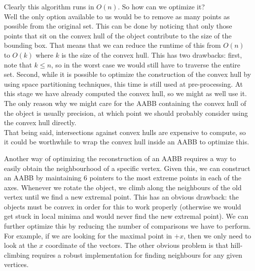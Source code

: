     Clearly this algorithm runs in $O(n)$. So how can we optimize it?\\
    Well the only option available to us would be to remove as many points as
    possible from the original set. This can be done by noticing that only those
    points that sit on the convex hull of the object contribute to the size of
    the bounding box. That means that we can reduce the runtime of this from
    $O(n)$ to $O(k)$ where $k$ is the size of the convex hull. This has two
    drawbacks: first, note that $k \leq n$, so in the worst case we would still
    have to traverse the entire set. Second, while it is possible to optimize
    the construction of the convex hull by using space partitioning techniques,
    this time is still used at pre-processing. At this stage we have already
    computed the convex hull, so we might as well use it. The only reason why we
    might care for the AABB containing the convex hull of the object is usually
    precision, at which point we should probably consider using the convex hull
    directly.\\
    That being said, intersections against convex hulls are expensive to
    compute, so it could be worthwhile to wrap the convex hull inside an AABB to
    optimize this.


    Another way of optimizing the reconstruction of an AABB requires a way
    to easily obtain the neighbourhood of a specific vertex. Given this, we
    can construct an AABB by maintaining 6 pointers to the most extreme
    points in each of the axes. Whenever we rotate the object, we climb
    along the neighbours of the old vertex until we find a new extremal
    point. This has an obvious drawback: the objects must be convex in order
    for this to work properly (otherwise we would get stuck in local minima
    and would never find the new extremal point). We can further optimize
    this by reducing the number of comparisons we have to perform. For
    example, if we are looking for the maximal point in $+x$, then we only
    need to look at the $x$ coordinate of the vectors. The other obvious
    problem is that hill-climbing requires a robust implementation for
    finding neighbours for any given vertices.

